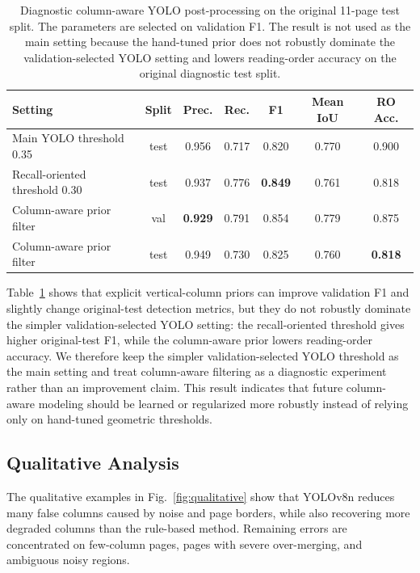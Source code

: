 \documentclass[pdflatex,sn-mathphys-num]{sn-jnl}
\begin{document}
\begin{table}[t]
\centering
\scriptsize\setlength{\tabcolsep}{3pt}
\caption{Diagnostic column-aware YOLO post-processing on the original 11-page test split. The parameters are selected on validation F1. The result is not used as the main setting because the hand-tuned prior does not robustly dominate the validation-selected YOLO setting and lowers reading-order accuracy on the original diagnostic test split.}
\label{tab:column_aware_diag}
\begin{tabular}{lcccccc}
\toprule
Setting & Split & Prec. & Rec. & F1 & Mean IoU & RO Acc. \\
\midrule
Main YOLO threshold 0.35 & test & 0.956 & 0.717 & 0.820 & 0.770 & 0.900 \\
Recall-oriented threshold 0.30 & test & 0.937 & 0.776 & \textbf{0.849} & 0.761 & 0.818 \\
Column-aware prior filter & val & \textbf{0.929} & 0.791 & 0.854 & 0.779 & 0.875 \\
Column-aware prior filter & test & 0.949 & 0.730 & 0.825 & 0.760 & \textbf{0.818} \\
\bottomrule
\end{tabular}
\end{table}

Table~\ref{tab:column_aware_diag} shows that explicit vertical-column priors can improve validation F1 and slightly change original-test detection metrics, but they do not robustly dominate the simpler validation-selected YOLO setting: the recall-oriented threshold gives higher original-test F1, while the column-aware prior lowers reading-order accuracy. We therefore keep the simpler validation-selected YOLO threshold as the main setting and treat column-aware filtering as a diagnostic experiment rather than an improvement claim. This result indicates that future column-aware modeling should be learned or regularized more robustly instead of relying only on hand-tuned geometric thresholds.

\subsection{Qualitative Analysis}
The qualitative examples in Fig.~\ref{fig:qualitative} show that YOLOv8n reduces many false columns caused by noise and page borders, while also recovering more degraded columns than the rule-based method. Remaining errors are concentrated on few-column pages, pages with severe over-merging, and ambiguous noisy regions.
\end{document}

